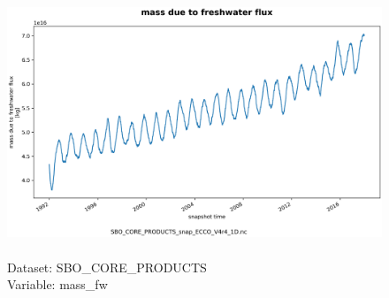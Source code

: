 \begin{figure}[H]
\centering
\includegraphics[scale=0.5]{../images/plots/oneD_plots/SBO_Core_Products/mass_fw.png}
\caption{\\Dataset: SBO\_CORE\_PRODUCTS\\Variable: mass\_fw}
\label{tab:table-SBO_CORE_PRODUCTS_mass_fw-Plot}
\end{figure}
\pagebreak
